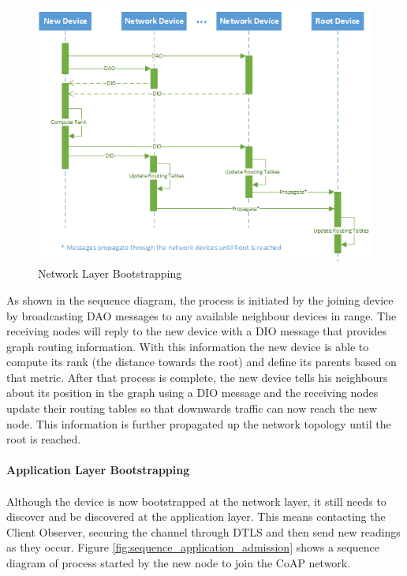 \begin{figure}[h]
  \centering
  \includegraphics[width=0.8\linewidth]{figures/Sequence_Network_Admission.png}
  \caption{Network Layer Bootstrapping}
  \label{fig:sequence_network_admission}
\end{figure}

As shown in the sequence diagram, the process is initiated by the joining device by broadcasting \ac{DAO} messages to any available neighbour devices in range. The receiving nodes will reply to the new device with a \ac{DIO} message that provides graph routing information. With this information the new device is able to compute its rank (the distance towards the root) and define its parents based on that metric. After that process is complete, the new device tells his neighbours about its position in the graph using a \ac{DIO} message and the receiving nodes update their routing tables so that downwards traffic can now reach the new node. This information is further propagated up the network topology until the root is reached.

\paragraph{\textbf{Application Layer Bootstrapping}}
\paragraph{}

Although the device is now bootstrapped at the network layer, it still needs to discover and be discovered at the application layer. This means contacting the Client Observer, securing the channel through \ac{DTLS} and then send new readings as they occur. Figure \ref{fig:sequence_application_admission} shows a sequence diagram of process started by the new node to join the \ac{CoAP} network.

